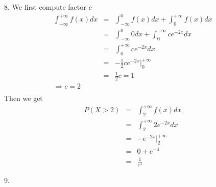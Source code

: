 \documentclass[12pt]{article}
\begin{document}
8. We first compute factor $c$
\begin{eqnarray*}
\int_{-\infty}^{+\infty} f(x) dx
&=& \int_{-\infty}^{0} f(x) dx + \int_{0}^{+\infty} f(x) dx \\
&=& \int_{-\infty}^{0} 0 dx + \int_{0}^{+\infty} c e^{-2x} dx \\
&=& \int_{0}^{+\infty} c e^{-2x} dx \\
&=& - \frac {1}{2} c e^{-2x}|_0^{+\infty} \\
&=& \frac {1}{2} c = 1 \\
\Longrightarrow c = 2 \\
\end{eqnarray*}
Then we get
\begin{eqnarray*}
P(X > 2)
&=& \int_{2}^{+\infty} f(x) dx \\
&=& \int_{2}^{+\infty} 2 e^{-2x} dx \\
&=& -e^{-2x}|_{2}^{+\infty} \\
&=& 0 + e^{-4} \\
&=& \frac {1}{e^4}
\end{eqnarray*}

9. \\
\end{document}
